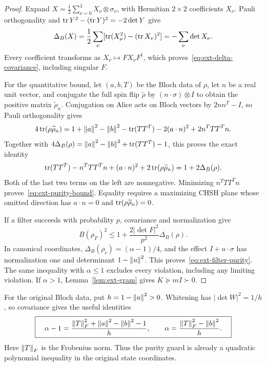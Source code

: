 \begin{proof}
Expand $X=\tfrac12\sum_{\nu=0}^3X_\nu\otimes\sigma_\nu$, with Hermitian
$2\times2$ coefficients $X_\nu$. Pauli orthogonality and
$\operatorname{tr} Y^2-(\operatorname{tr} Y)^2=-2\det Y$ give
\[
 \Delta_B(X)
 =\frac12\sum_\nu[\operatorname{tr}(X_\nu^2)-(\operatorname{tr} X_\nu)^2]
 =-\sum_\nu\det X_\nu.
\]
Every coefficient transforms as $X_\nu\mapsto FX_\nu F^\dagger$,
which proves~\eqref{eq:ext-delta-covariance}, including singular $F$.

For the quantitative bound, let $(a,b,T)$ be the Bloch data of $\rho$,
let $n$ be a real unit vector, and conjugate the full spin flip
$\widetilde\rho$ by $(n\cdot\sigma)\otimes I$ to obtain the positive
matrix $\widetilde\rho_n$. Conjugation on Alice acts on Bloch vectors
by $2nn^T-I$, so Pauli orthogonality gives
\[
 4\operatorname{tr}(\rho\widetilde\rho_n)
 =1+\left\lVert a\right\rVert^2-\left\lVert b\right\rVert^2-\operatorname{tr}(TT^T)
       -2(a\cdot n)^2+2n^TTT^Tn.
\]
Together with
$4\Delta_B(\rho)=\left\lVert a\right\rVert^2-\left\lVert b\right\rVert^2+\operatorname{tr}(TT^T)-1$, this proves
the exact identity
\begin{equation}
 \operatorname{tr}(TT^T)-n^TTT^Tn+(a\cdot n)^2
       +2\operatorname{tr}(\rho\widetilde\rho_n)
 =1+2\Delta_B(\rho).
 \label{eq:ext-plane-purity}
\end{equation}
Both of the last two terms on the left are nonnegative. Minimizing
$n^TTT^Tn$ proves~\eqref{eq:ext-purity-bound}. Equality requires a
maximizing CHSH plane whose omitted direction has $a\cdot n=0$ and
$\operatorname{tr}(\rho\widetilde\rho_n)=0$.

If a filter succeeds with probability $p$, covariance and normalization
give
\[
 B(\rho_F)^2
 \le1+\frac{2|\det F|^2}{p^2}\Delta_B(\rho).
\]
In canonical coordinates,
$\Delta_B(\rho_c)=(\alpha-1)/4$, and the effect $I+u\cdot\sigma$
has normalization one and determinant $1-\left\lVert u\right\rVert^2$.
This proves~\eqref{eq:ext-filter-purity}. The same inequality with
$\alpha\le1$ excludes every violation, including any limiting violation.
If $\alpha>1$, Lemma~\ref{lem:ext-gram} gives
$K\succeq mI\succ0$.
\end{proof}

For the original Bloch data, put $h=1-\left\lVert a\right\rVert^2>0$. Whitening has
$|\det W|^2=1/h$, so covariance gives the useful identities
\begin{equation}
 \boxed{\quad
 \alpha-1=\frac{\left\lVert T\right\rVert_F^2+\left\lVert a\right\rVert^2-\left\lVert b\right\rVert^2-1}{h},
 \qquad
 \alpha=\frac{\left\lVert T\right\rVert_F^2-\left\lVert b\right\rVert^2}{h}.
 \quad}
 \label{eq:ext-raw-alpha}
\end{equation}
Here $\left\lVert T\right\rVert_F$ is the Frobenius norm. Thus the purity guard is
already a quadratic polynomial inequality in the original state
coordinates.

